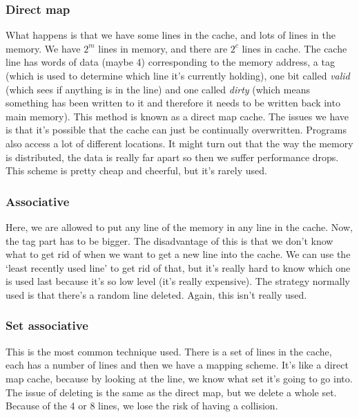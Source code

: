\documentclass[11pt,a4paper,titlepage,dvipsnames,cmyk]{scrartcl}
\begin{document}
\subsubsection{Direct map}%
\label{ssub:Direct map}
What happens is that we have some lines in the cache, and lots of lines in
the memory. We have $2^m$ lines in memory, and there are $2^c$ lines in
cache. The cache line has words of data (maybe 4) corresponding to the
memory address, a tag (which is used to determine which line it's
currently holding), one bit called \textit{valid} (which sees if anything
is in the line) and one called \textit{dirty} (which means something has
been written to it and therefore it needs to be written back into main
memory). This method is known as a direct map cache. The issues we have is
that it's possible that the cache can just be continually overwritten.
Programs also access a lot of different locations. It might turn out that
the way the memory is distributed, the data is really far apart so then we
suffer performance drops. This scheme is pretty cheap and cheerful, but
it's rarely used.

\subsubsection{Associative}%
\label{ssub:Associative}
Here, we are allowed to put any line of the memory in any line in the
cache. Now, the tag part has to be bigger. The disadvantage of this is
that we don't know what to get rid of when we want to get a new line into
the cache. We can use the `least recently used line' to get rid of that,
but it's really hard to know which one is used last because it's so low
level (it's really expensive). The strategy normally used is that there's
a random line deleted. Again, this isn't really used.

\subsubsection{Set associative}%
\label{ssub:Set associative}
This is the most common technique used. There is a set of lines in the
cache, each has a number of lines and then we have a mapping scheme. It's
like a direct map cache, because by looking at the line, we know what set
it's going to go into. The issue of deleting is the same as the direct
map, but we delete a whole set. Because of the 4 or 8 lines, we lose the
risk of having a collision.
\end{document}
